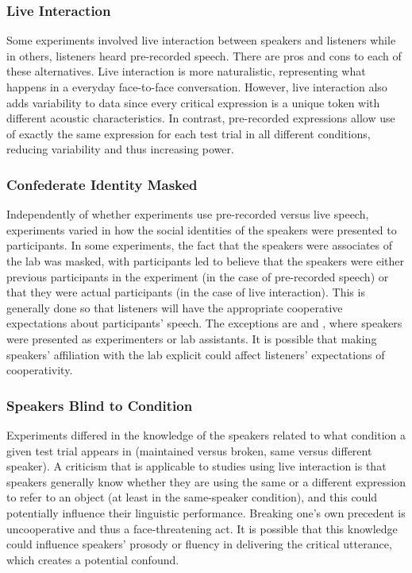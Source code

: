 \documentclass[doc,fignum,apacite,floatsintext]{apa6}
\begin{document}
\subsubsection{Live Interaction}
Some experiments involved live interaction between speakers and listeners while in others, listeners heard pre-recorded speech. There are pros and cons to each of these alternatives. Live interaction is more naturalistic, representing what happens in a everyday face-to-face conversation. However, live interaction also adds variability to data since every critical expression is a unique token with different acoustic characteristics.  In contrast, pre-recorded expressions allow use of exactly the same expression for each test trial in all different conditions, reducing variability and thus increasing power.

\subsubsection{Confederate Identity Masked}
Independently of whether experiments use pre-recorded versus live speech, experiments varied in how the social identities of the speakers were presented to participants.  In some experiments, the fact that the speakers were associates of the lab was masked, with participants led to believe that the speakers were either previous participants in the experiment (in the case of pre-recorded speech) or that they were actual participants (in the case of live interaction).  This is generally done so that listeners will have the appropriate cooperative expectations about participants' speech.  The exceptions are  and , where speakers were presented as experimenters or lab assistants.  It is possible that making speakers' affiliation with the lab explicit could affect listeners' expectations of cooperativity.

\subsubsection{Speakers Blind to Condition}
Experiments differed in the knowledge of the speakers related to what condition a given test trial appears in (maintained versus broken, same versus different speaker). A criticism that is applicable to studies using live interaction is that speakers generally know whether they are using the same or a different expression to refer to an object (at least in the same-speaker condition), and this could potentially influence their linguistic performance.  Breaking one's own precedent is uncooperative and thus a face-threatening act.  It is possible that this knowledge could influence speakers' prosody or fluency in delivering the critical utterance, which creates a potential confound.
\end{document}
